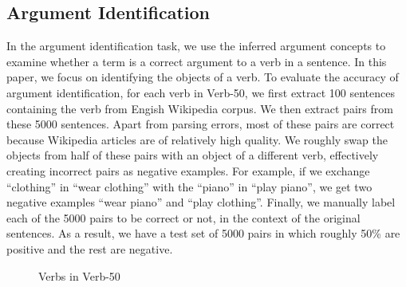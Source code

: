 \subsection{Argument Identification}

In the argument identification task, we use the inferred argument concepts
to examine whether a term is a correct argument to a verb in a sentence.
In this paper, we focus on identifying the objects of a verb. To evaluate
the accuracy of argument identification, for each verb in Verb-50,
we first extract 100 sentences containing the verb from Engish Wikipedia
corpus. We then extract  pairs from these 5000 sentences.
Apart from parsing errors, most of these pairs are correct
because Wikipedia articles are of relatively high quality.
We roughly swap the objects from half of these pairs with an object of
a different verb, effectively creating incorrect pairs as negative examples.
For example, if we exchange ``clothing'' in ``wear clothing'' with the ``piano''
in ``play piano'', we get two negative examples ``wear piano''
and ``play clothing''.
Finally, we manually label each of the 5000 pairs to be correct or not,
in the context of the original sentences.  As a result, we have a test
set of 5000  pairs in which roughly 50\% are positive and
the rest are negative.

\begin{figure}[th]
\centering
\small
{}
\caption{Verbs in Verb-50}
\label{fig:verb50}
\end{figure}

